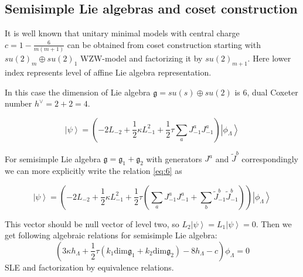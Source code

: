 \documentclass[a4paper]{jpconf}
\theoremstyle{definition}
\newcommand{\gf}{\mathfrak{g}}
\theoremstyle{definition} \newtheorem{Def}{Definition}
\begin{document}
\subsection{Semisimple Lie algebras and coset construction}
\label{sec:semis-lie-algebr}

It is well known that unitary minimal models with central charge $c=1-\frac{6}{m(m+1)}$ can be obtained from coset construction starting with $su(2)_{m}\oplus su(2)_{1}$ WZW-model and factorizing it by $su(2)_{m+1}$. Here lower index represents level of affine Lie algebra representation. 

In this case the dimension of Lie algebra $\gf=su(s)\oplus su(2)$ is 6, dual Coxeter number $h^{\vee}=2+2=4$. 


\begin{equation}
  \left| \psi\right>=\left(-2 L_{-2}+\frac{1}{2}\kappa L_{-1}^{2}+\frac{1}{2}\tau\sum_{a} J^{a}_{-1} J^{a}_{-1}\right) \left|\phi_{\Lambda}\right>    
\label{eq:6}
\end{equation}

For semisimple Lie algebra $\gf=\gf_{1}+\gf_{2}$ with generators $J^{a}$ and $\tilde{J}^{b}$ correspondingly we can more explicitly write the relation \eqref{eq:6} as 

\begin{equation*}
  \left| \psi\right>=\left(-2 L_{-2}+\frac{1}{2}\kappa L_{-1}^{2}+\frac{1}{2}\tau\left(\sum_{a} J^{a}_{-1} J^{a}_{-1}+\sum_{b}\tilde{J}^{b}_{-1}\tilde{J}^{b}_{-1}\right) \right) \left|\phi_{\Lambda}\right>    
\end{equation*}

This vector should be null vector of level two, so $L_{2}\left|\psi\right>=L_{1}\left|\psi\right>=0$. Then we get following algebraic relations for semisimple Lie algebra:
\begin{equation}
  \label{eq:7}
  \left( 3\kappa h_{\Lambda} +\frac{1}{2} \tau (k_{1} \mathrm{dim} \gf_{1}+k_{2}\mathrm{dim} \gf_{2}) -8 h_{\Lambda} - c\right)\phi_{\Lambda}=0
\end{equation}
SLE and factorization by equivalence relations. 
\end{document}
